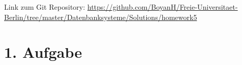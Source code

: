 \usepackage{graphicx}
\usepackage{fancyvrb}

\newcommand{\dozent}{Prof. Dr. Agn`es Voisard, Nicolas Lehmann}					%
\newcommand{\tutor}{Nicolas Lehmann}						%
\newcommand{\tutoriumNo}{10}				%
\newcommand{\projectNo}{5}									%
\newcommand{\veranstaltung}{Datenbanksysteme}	%
\newcommand{\semester}{SoSe 2017}						%
\newcommand{\studenten}{Boyan Hristov, Julian Habib}			%




Link zum Git Repository: \url{https://github.com/BoyanH/Freie-Universitaet-Berlin/tree/master/Datenbanksysteme/Solutions/homework5}


\section*{1. Aufgabe}

